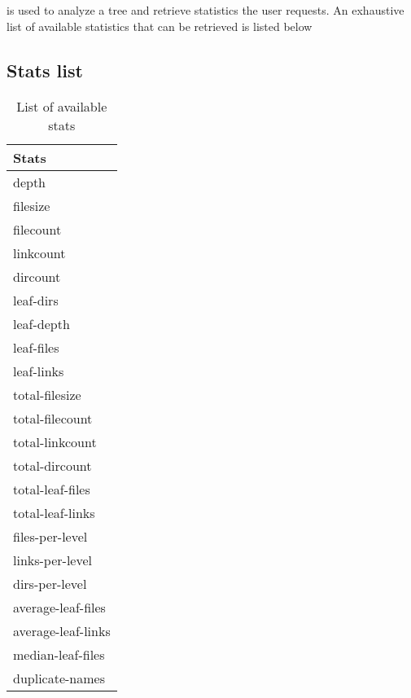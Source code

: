 \section{\gufistats}
\gufistats is used to analyze a tree and retrieve statistics the user
requests. An exhaustive list of available statistics that can be
retrieved is listed below

\subsection{Stats list}
\begin{table} [h]
  \centering
  \begin{tabular}{l}
    Stats\\\hline
    depth \\
    filesize \\
    filecount \\
    linkcount \\
    dircount \\
    leaf-dirs \\
    leaf-depth \\
    leaf-files \\
    leaf-links \\
    total-filesize \\
    total-filecount \\
    total-linkcount \\
    total-dircount \\
    total-leaf-files \\
    total-leaf-links \\
    files-per-level \\
    links-per-level \\
    dirs-per-level \\
    average-leaf-files \\
    average-leaf-links \\
    median-leaf-files \\
    duplicate-names
  \end{tabular}
  \caption{\label{fig:stat_options}List of available stats}
\end{table}


